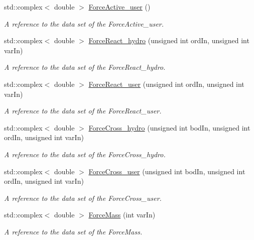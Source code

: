 \begin{DoxyCompactItemize}
std\-::complex$<$ double $>$ \hyperlink{classosea_1_1ofreq_1_1_equationof_motion_a238df115825cbe08522bdc10b84880b9}{Force\-Active\-\_\-user} ()
\begin{DoxyCompactList}\small\item\em A reference to the data set of the Force\-Active\-\_\-user. \end{DoxyCompactList}\item 
std\-::complex$<$ double $>$ \hyperlink{classosea_1_1ofreq_1_1_equationof_motion_a4962df48c786fced4e953e50f1d82a3a}{Force\-React\-\_\-hydro} (unsigned int ord\-In, unsigned int var\-In)
\begin{DoxyCompactList}\small\item\em A reference to the data set of the Force\-React\-\_\-hydro. \end{DoxyCompactList}\item 
std\-::complex$<$ double $>$ \hyperlink{classosea_1_1ofreq_1_1_equationof_motion_ac1f572e423c09b9e9fa955f52434a8f7}{Force\-React\-\_\-user} (unsigned int ord\-In, unsigned int var\-In)
\begin{DoxyCompactList}\small\item\em A reference to the data set of the Force\-React\-\_\-user. \end{DoxyCompactList}\item 
std\-::complex$<$ double $>$ \hyperlink{classosea_1_1ofreq_1_1_equationof_motion_af1d1f42b77561e9f1c4110e16af309da}{Force\-Cross\-\_\-hydro} (unsigned int bod\-In, unsigned int ord\-In, unsigned int var\-In)
\begin{DoxyCompactList}\small\item\em A reference to the data set of the Force\-Cross\-\_\-hydro. \end{DoxyCompactList}\item 
std\-::complex$<$ double $>$ \hyperlink{classosea_1_1ofreq_1_1_equationof_motion_a3b06b1ff4b792ad3a3d3c0274426d5ed}{Force\-Cross\-\_\-user} (unsigned int bod\-In, unsigned int ord\-In, unsigned int var\-In)
\begin{DoxyCompactList}\small\item\em A reference to the data set of the Force\-Cross\-\_\-user. \end{DoxyCompactList}\item 
std\-::complex$<$ double $>$ \hyperlink{classosea_1_1ofreq_1_1_equationof_motion_a848b45b70d29d793b86a7c1ca8f97ed6}{Force\-Mass} (int var\-In)
\begin{DoxyCompactList}\small\item\em A reference to the data set of the Force\-Mass. \end{DoxyCompactList}\item 

\end{DoxyCompactItemize}
